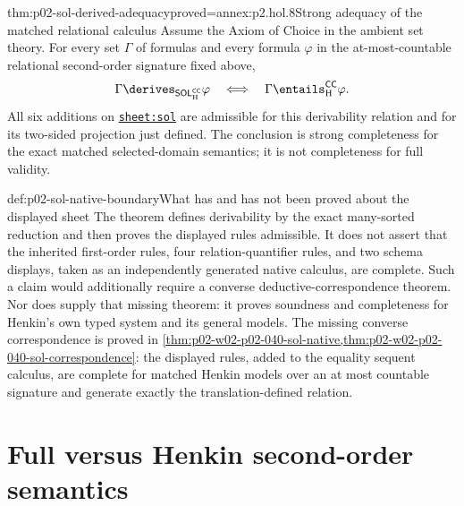 \begin{hbtheorem}{thm:p02-sol-derived-adequacy}{proved=annex:p2.hol.8}{Strong adequacy of the matched relational calculus}
Assume the Axiom of Choice in the ambient set theory.  For every set
\(\Gamma\) of formulas and every formula \(\varphi\) in the at-most-countable
relational second-order signature fixed above,
\[
 \Gamma\derives_{\mathsf{SOL}_{\mathrm H}^{\mathsf{CC}}}\varphi
 \quad\Longleftrightarrow\quad
 \Gamma\entails_{\mathrm H}^{\mathsf{CC}}\varphi.
\]
All six additions on \hyperref[sheet:sol]{\texttt{sheet:sol}} are admissible
for this derivability relation and for its two-sided projection just defined.
The conclusion is
strong completeness for the exact matched
selected-domain semantics; it is not completeness for full validity.
\end{hbtheorem}

\begin{proofboundary}{def:p02-sol-native-boundary}{What has and has not been proved about the displayed sheet}
The theorem defines derivability by the exact many-sorted reduction and then
proves the displayed rules admissible.  It does not assert that the inherited
first-order rules, four relation-quantifier rules, and two schema displays,
taken as an independently generated native calculus, are complete.  Such a
claim would additionally require a converse deductive-correspondence theorem.
Nor does \cite{Henkin1950} supply that missing theorem: it proves soundness and
completeness for Henkin's own typed system and its general models. The missing converse correspondence is proved in \cref{thm:p02-w02-p02-040-sol-native,thm:p02-w02-p02-040-sol-correspondence}: the displayed rules, added to the equality sequent calculus, are complete for matched Henkin models over an at most countable signature and generate exactly the translation-defined relation.
\end{proofboundary}


\section{Full versus Henkin second-order semantics}
\label{sec:p02-sol-comparison}

